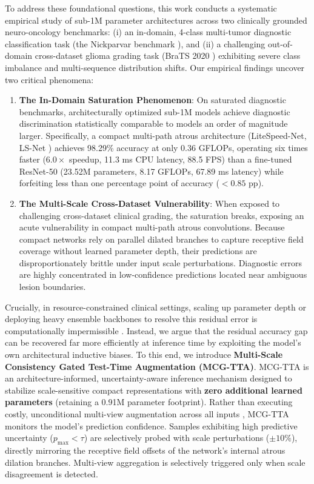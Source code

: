 To address these foundational questions, this work conducts a systematic empirical study of sub-1M parameter architectures across two clinically grounded neuro-oncology benchmarks: (i) an in-domain, 4-class multi-tumor diagnostic classification task (the Nickparvar benchmark \cite{34}), and (ii) a challenging out-of-domain cross-dataset glioma grading task (BraTS 2020 \cite{2, 28}) exhibiting severe class imbalance and multi-sequence distribution shifts. Our empirical findings uncover two critical phenomena:
\begin{enumerate}
\item \textbf{The In-Domain Saturation Phenomenon}: On saturated diagnostic benchmarks, architecturally optimized sub-1M models achieve diagnostic discrimination statistically comparable to models an order of magnitude larger. Specifically, a compact multi-path atrous architecture (LiteSpeed-Net, LS-Net \cite{21}) achieves 98.29\% accuracy at only 0.36 GFLOPs, operating six times faster ($6.0\times$ speedup, 11.3 ms CPU latency, 88.5 FPS) than a fine-tuned ResNet-50 (23.52M parameters, 8.17 GFLOPs, 67.89 ms latency) while forfeiting less than one percentage point of accuracy ($<0.85$ pp).
\item \textbf{The Multi-Scale Cross-Dataset Vulnerability}: When exposed to challenging cross-dataset clinical grading, the saturation breaks, exposing an acute vulnerability in compact multi-path atrous convolutions. Because compact networks rely on parallel dilated branches to capture receptive field coverage without learned parameter depth, their predictions are disproportionately brittle under input scale perturbations. Diagnostic errors are highly concentrated in low-confidence predictions located near ambiguous lesion boundaries.
\end{enumerate}

Crucially, in resource-constrained clinical settings, scaling up parameter depth or deploying heavy ensemble backbones to resolve this residual error is computationally impermissible \cite{21, 41}. Instead, we argue that the residual accuracy gap can be recovered far more efficiently at inference time by exploiting the model's own architectural inductive biases. To this end, we introduce \textbf{Multi-Scale Consistency Gated Test-Time Augmentation (MCG-TTA)}. MCG-TTA is an architecture-informed, uncertainty-aware inference mechanism designed to stabilize scale-sensitive compact representations with \textbf{zero additional learned parameters} (retaining a 0.91M parameter footprint). Rather than executing costly, unconditional multi-view augmentation across all inputs \cite{4, 47}, MCG-TTA monitors the model's prediction confidence. Samples exhibiting high predictive uncertainty ($p_{\max} < \tau$) are selectively probed with scale perturbations ($\pm 10\%$), directly mirroring the receptive field offsets of the network's internal atrous dilation branches. Multi-view aggregation is selectively triggered only when scale disagreement is detected.

